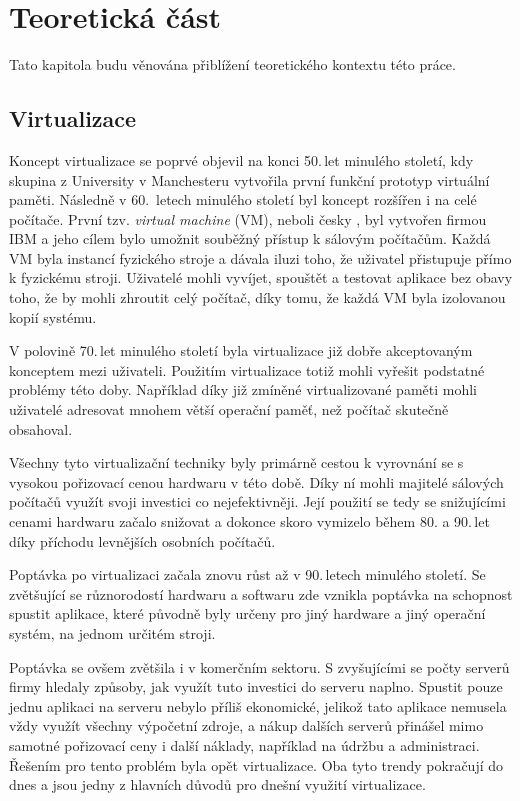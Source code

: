 \chapter{Teoretická část}\label{chap:teorie}

Tato kapitola budu věnována přiblížení teoretického kontextu této práce.

\section{Virtualizace}\label{sec:virtualization}

Koncept virtualizace se poprvé objevil na konci 50.\,let minulého století, kdy skupina z University v Manchesteru vytvořila první funkční prototyp virtuální paměti. Následně v 60.\, letech minulého století byl koncept rozšířen i na celé počítače. První tzv. \textit{virtual machine} (VM), neboli česky , byl vytvořen firmou IBM a jeho cílem bylo umožnit souběžný přístup k sálovým počítačům. Každá VM byla instancí fyzického stroje a dávala iluzi toho, že uživatel přistupuje přímo k fyzickému stroji. Uživatelé mohli vyvíjet, spouštět a testovat aplikace bez obavy toho, že by mohli zhroutit celý počítač, díky tomu, že každá VM byla izolovanou kopií systému. 

V polovině 70.\,let minulého století byla virtualizace již dobře akceptovaným konceptem mezi uživateli. Použitím virtualizace totiž mohli vyřešit podstatné problémy této doby. Například díky již zmíněné virtualizované paměti mohli uživatelé adresovat mnohem větší operační paměť, než počítač skutečně obsahoval. 

Všechny tyto virtualizační techniky byly primárně cestou k vyrovnání se s vysokou pořizovací cenou hardwaru v této době. Díky ní mohli majitelé sálových počítačů využít svoji investici co nejefektivněji. Její použití se tedy se snižujícími cenami hardwaru začalo snižovat a dokonce skoro vymizelo během 80. a 90.\,let díky příchodu levnějších osobních počítačů.  

Poptávka po virtualizaci začala znovu růst až v 90.\,letech minulého století. Se zvětšující se různorodostí hardwaru a softwaru zde vznikla poptávka na schopnost spustit aplikace, které původně byly určeny pro jiný hardware a jiný operační systém, na jednom určitém stroji. 

Poptávka se ovšem zvětšila i v komerčním sektoru. S zvyšujícími se počty serverů firmy hledaly způsoby, jak využít tuto investici do serveru naplno. Spustit pouze jednu aplikaci na serveru nebylo příliš ekonomické, jelikož tato aplikace nemusela vždy využít všechny výpočetní zdroje, a nákup dalších serverů přinášel mimo samotné pořizovací ceny i další náklady, například na údržbu a administraci. Řešením pro tento problém byla opět virtualizace. Oba tyto trendy pokračují do dnes a jsou jedny z hlavních důvodů pro dnešní využití virtualizace. 

